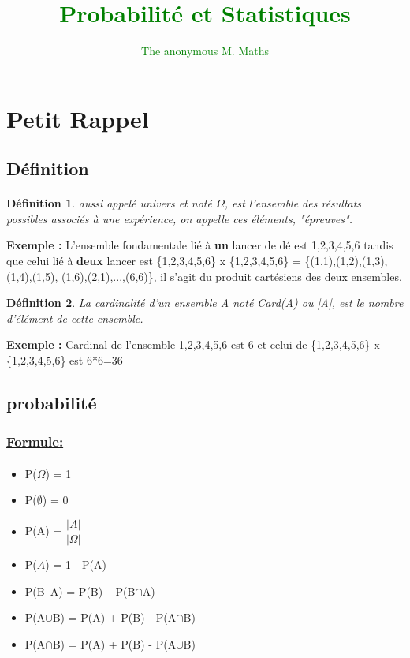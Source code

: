 \documentclass[a4paper]{article}
\author{\textcolor{Green}{The anonymous M. Maths}}
\title{\textcolor{Green}{\textbf{Probabilité et Statistiques}}}
\begin{document}
\maketitle
\tableofcontents
\newpage

\section{Petit Rappel}

\subsection{Définition}

\paragraph{}

\newtheorem{rappel}{Définition}
\begin{rappel}
 aussi  appelé  \textit{univers} et noté $\Omega$, est l'ensemble des résultats possibles associés à une expérience, on appelle ces éléments, "épreuves".
\end{rappel}

\textbf{Exemple :} L'ensemble fondamentale lié à \textbf{un} lancer de dé est {1,2,3,4,5,6} tandis que celui lié à \textbf{deux} lancer est \{1,2,3,4,5,6\} x \{1,2,3,4,5,6\} = \{(1,1),(1,2),(1,3),(1,4),(1,5),
\newline (1,6),(2,1),...,(6,6)\}, il s'agit du produit cartésiens des deux ensembles.
\vspace{5mm}
\begin{rappel}
La cardinalité d'un ensemble A noté \textit{Card(A)} ou \textit{|A|}, est le nombre d'élément de cette ensemble.
\end{rappel}

\textbf{Exemple :} Cardinal de l'ensemble {1,2,3,4,5,6} est 6 et celui de \{1,2,3,4,5,6\} x \{1,2,3,4,5,6\} est 6*6=36

\subsection{probabilité}

\subsubsection{{\underline{Formule:}}}
\paragraph{}
\begin{itemize}
\item P($\Omega$) = 1
\item P($\emptyset$) = 0
\item P(A) = $\dfrac{|A|}{|\Omega|}$
\item P($\overline{A}$) = 1 - P(A)
\item P(B--A) = P(B) -- P(B$\cap$A)
\item P(A$\cup$B) = P(A) + P(B) - P(A$\cap$B)
\item P(A$\cap$B) = P(A) + P(B) - P(A$\cup$B)


\end{itemize}
\end{document}
